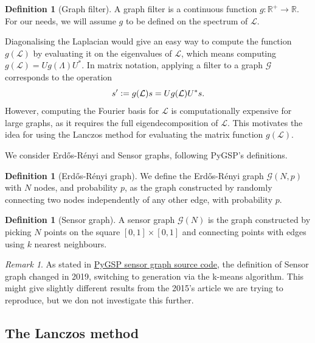 \documentclass[11pt]{article}
\renewcommand{\mathbb}[1]{\mathds{#1}}
\newcommand{\R}{\mathbb{R}}
\newcommand{\G}{\mathcal{G}}
\renewcommand{\L}{\mathcal{L}}
\newcommand{\defeq}{\vcentcolon=}
\theoremstyle{definition}
\newtheorem{definition}[theorem]{Definition}
\theoremstyle{remark}
\newtheorem{remark}[theorem]{Remark}
\theoremstyle{experimental}
\begin{document}
\begin{definition}[Graph filter]
  A graph filter is a continuous function $ g : \R^+ \to \R $. For our needs, we will assume $ g $ to be defined on the spectrum of $ \L $.
\end{definition}
Diagonalising the Laplacian would give an easy way to compute the function $ g(\L) $ by
evaluating it on the eigenvalues of $ \L $, which means computing $ g(\L) = U g(\Lambda) U^{*} $.
In matrix notation, applying a filter to a graph $ \G $ corresponds to the operation
\begin{equation*}
  s^\prime \defeq g(\L)s = U g(\L) U^{*}s.
\end{equation*}
However, computing the Fourier basis for $ \L $ is computationally expensive for large
graphs, as it requires the full eigendecomposition of $ \L $. This motivates the idea for using the Lanczos method for evaluating the matrix function $ g(\L)$.

We consider Erdős-Rényi and Sensor graphs, following PyGSP's \cite{pygsp} definitions.
\begin{definition}[Erdős-Rényi graph]
  \label{def:ER}
  We define the Erdős-Rényi graph $ \G(N,p) $ with $ N $ nodes, and probability $ p $, as the graph
  constructed by randomly connecting two nodes independently of any other edge, with probability $ p $.
\end{definition}
\begin{definition}[Sensor graph]
  \label{def:Sensor}
  A sensor graph $ \G(N) $ is the graph constructed by picking $ N $ points on the square $ \left[
  0,1 \right] \times \left[ 0,1 \right] $ and connecting points with edges using $ k $ nearest
  neighbours.
\end{definition}
\begin{remark}
  As stated in \href{https://github.com/epfl-lts2/pygsp/blob/4716b12c470c579e3f477f2d1c1d99752c73252d/pygsp/graphs/nngraphs/sensor.py#L6}{PyGSP
    sensor graph source code}, the definition of Sensor graph changed in 2019, switching to
    generation via the k-means algorithm. This might give slightly different results from the 2015's article
    \cite{susnjara2015} we are trying to reproduce, but we don not investigate this further.
  
\end{remark}



\subsection{The Lanczos method}
\end{document}
